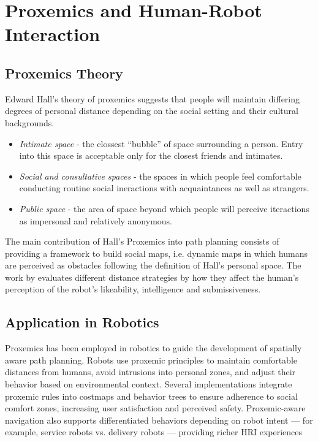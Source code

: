 
\section{Proxemics and Human-Robot Interaction}



\subsection{Proxemics Theory}
Edward Hall's theory of proxemics \cite{proxemicstheoryHall} suggests
that people will maintain differing degrees of personal distance depending on the 
social setting and their cultural backgrounds. 
\begin{itemize}
    \item \textit{Intimate space} - the clossest ``bubble'' of space surrounding a person.
    Entry into this space is acceptable only for the closest friends and intimates.
    \item \textit{Social and consultative spaces} - the spaces in which people feel 
    comfortable conducting routine social ineractions with acquaintances as well as 
    strangers.
    \item \textit{Public space} - the area of space beyond which people will perceive 
    iteractions as impersonal and relatively anonymous.
\end{itemize}
The main contribution of Hall's Proxemics into path planning consists of providing a 
framework to build social maps, i.e. dynamic maps in which humans are perceived 
as obstacles following the definition of Hall's personal space.   
The work by \cite{henkel} evaluates different distance strategies by how 
they affect the human's perception of the robot's likeability, intelligence and submissiveness.

\subsection{Application in Robotics}
Proxemics has been employed in robotics to guide the development of spatially aware path 
planning. Robots use proxemic principles to maintain comfortable distances from humans, 
avoid intrusions into personal zones, and adjust their behavior based on environmental 
context. Several implementations integrate proxemic rules into costmaps and behavior 
trees to ensure adherence to social comfort zones, increasing user satisfaction and 
perceived safety. Proxemic-aware navigation also supports differentiated behaviors 
depending on robot intent — for example, service robots vs. delivery robots — providing 
richer HRI experiences

